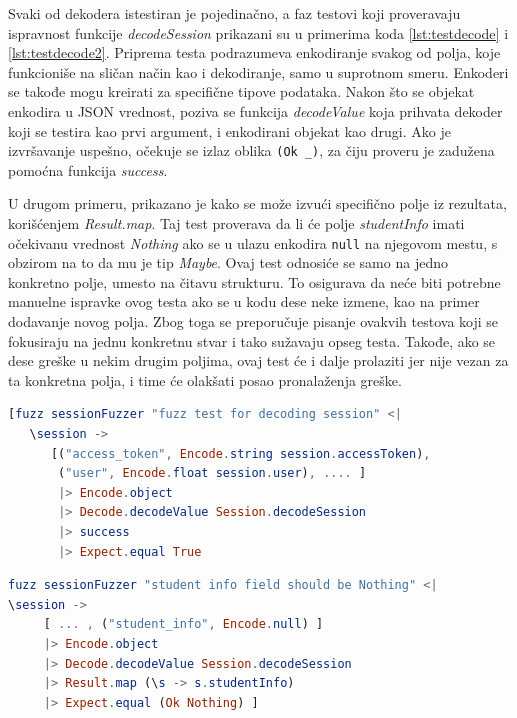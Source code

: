 \documentclass[12pt,oneside]{memoir}
\begin{document}
\par Svaki od dekodera istestiran je pojedinačno, a faz testovi koji proveravaju ispravnost funkcije \emph{decodeSession} prikazani su u primerima koda \ref{lst:testdecode} i \ref{lst:testdecode2}. Priprema testa podrazumeva enkodiranje svakog od polja, koje funkcioniše na sličan način kao i dekodiranje, samo u suprotnom smeru. Enkoderi se takođe mogu kreirati za specifične tipove podataka. Nakon što se objekat enkodira u JSON vrednost, poziva se funkcija \emph{decodeValue} koja prihvata dekoder koji se testira kao prvi argument, i enkodirani objekat kao drugi. Ako je izvršavanje uspešno, očekuje se izlaz oblika \texttt{(Ok \_)}, za čiju proveru je zadužena pomoćna funkcija \emph{success}. 
\par U drugom primeru, prikazano je kako se može izvući specifično polje iz rezultata, korišćenjem \emph{Result.map}. Taj test proverava da li će polje \emph{studentInfo} imati očekivanu vrednost \emph{Nothing} ako se u ulazu enkodira \texttt{null} na njegovom mestu, s obzirom na to da mu je tip \emph{Maybe}. Ovaj test odnosiće se samo na jedno konkretno polje, umesto na čitavu strukturu. To osigurava da neće biti potrebne manuelne ispravke ovog testa ako se u kodu dese neke izmene, kao na primer dodavanje novog polja. Zbog toga se preporučuje pisanje ovakvih testova koji se fokusiraju na jednu konkretnu stvar i tako sužavaju opseg testa. Takođe, ako se dese greške u nekim drugim poljima, ovaj test će i dalje prolaziti jer nije vezan za ta konkretna polja, i time će olakšati posao pronalaženja greške.

\begin{minipage}{\linewidth}
\begin{lstlisting}[language=elm, basicstyle=\small, caption={Implementacija prvog faz testa za funkciju \emph{decodeSession}},captionpos=b, label={lst:testdecode}]
[fuzz sessionFuzzer "fuzz test for decoding session" <| 
   \session -> 
      [("access_token", Encode.string session.accessToken),
       ("user", Encode.float session.user), .... ]
       |> Encode.object
       |> Decode.decodeValue Session.decodeSession
       |> success
       |> Expect.equal True
\end{lstlisting}
\end{minipage}
         
\begin{minipage}{\linewidth}
\begin{lstlisting}[language=elm, basicstyle=\small, caption={Implementacija drugog faz testa za funkciju \emph{decodeSession}},captionpos=b, label={lst:testdecode2}]
fuzz sessionFuzzer "student info field should be Nothing" <| 
\session -> 
     [ ... , ("student_info", Encode.null) ]
     |> Encode.object
     |> Decode.decodeValue Session.decodeSession
     |> Result.map (\s -> s.studentInfo)
     |> Expect.equal (Ok Nothing) ]
\end{lstlisting}
\end{minipage}
\end{document}
